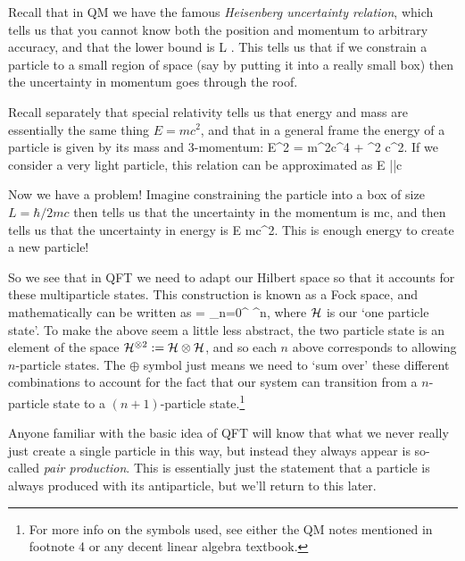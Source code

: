 Recall that in QM we have the famous \textit{Heisenberg uncertainty relation}, which tells us that you cannot know both the position and momentum to arbitrary accuracy, and that the lower bound is 
\be 
\label{eqn:UncertaintyRelation}
    \Delta L \Delta {} \geq {} \qquad \implies \qquad \Delta {} \geq {}.
\ee 
This tells us that if we constrain a particle to a small region of space (say by putting it into a really small box) then the uncertainty in momentum goes through the roof. 

Recall separately that special relativity tells us that energy and mass are essentially the same thing $E=mc^2$, and that in a general frame the energy of a particle is given by its mass and 3-momentum:
\bse 
    E^2 = m^2c^4 + ^2 c^2.
\ese 
If we consider a very light particle, this relation can be approximated as 
\be
\label{eqn:E=pc}
    E \approx ||c
\ee

Now we have a problem! Imagine constraining the particle into a box of size $L = \hbar/2mc$ then  tells us that the uncertainty in the momentum is 
\bse 
    \Delta {} \geq mc,
\ese 
and then  tells us that the uncertainty in energy is 
\bse 
    \Delta E \geq mc^2.
\ese 
This is enough energy to create a new particle!

So we see that in QFT we need to adapt our Hilbert space so that it accounts for these multiparticle states. This construction is known as a Fock space, and mathematically can be written as 
\be 
\label{eqn:FockSpace}
    \cF = \bigoplus_{n=0}^{\infty} \cH^{\otimes n},
\ee
where $\mathcal{H}$ is our `one particle state'. To make the above seem a little less abstract, the two particle state is an element of the space $\mathcal{H}^{\otimes 2} := \mathcal{H} \otimes \mathcal{H}$, and so each $n$ above corresponds to allowing $n$-particle states. The $\oplus$ symbol just means we need to `sum over' these different combinations to account for the fact that our system can transition from a $n$-particle state to a $(n+1)$-particle state.\footnote{For more info on the symbols used, see either the QM notes mentioned in footnote 4 or any decent linear algebra textbook.}

\br 
    Anyone familiar with the basic idea of QFT will know that what we never really just create a single particle in this way, but instead they always appear is so-called \textit{pair production}. This is essentially just the statement that a particle is always produced with its antiparticle, but we'll return to this later. 
\er 

